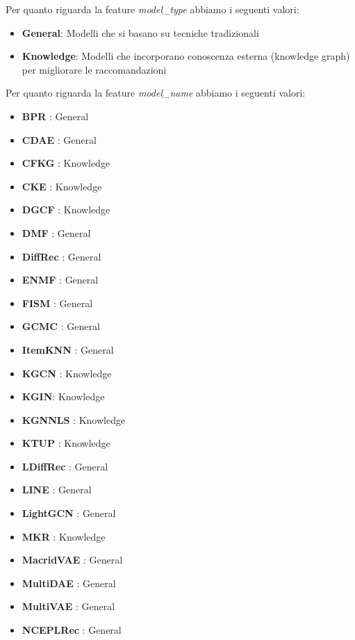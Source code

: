 \noindent Per quanto riguarda la feature \textit{model\_type} abbiamo i seguenti valori:
\begin{itemize}
    \item \textbf{General}: Modelli che si basano su tecniche tradizionali
    \item \textbf{Knowledge}: Modelli che incorporano conoscenza esterna (knowledge graph) per migliorare le raccomandazioni
\end{itemize}

Per quanto riguarda la feature \textit{model\_name} abbiamo i seguenti valori:
\begin{itemize}
    \item \textbf{BPR} \cite{BPR}: General
    \item \textbf{CDAE} \cite{CDAE}: General
    \item \textbf{CFKG} \cite{CFKG}: Knowledge
    \item \textbf{CKE} \cite{CKE}: Knowledge
    \item \textbf{DGCF} \cite{DGCF}: Knowledge
    \item \textbf{DMF} \cite{DMF}: General
    \item \textbf{DiffRec} \cite{DiffRec}: General
    \item \textbf{ENMF} \cite{ENMF}: General 
    \item \textbf{FISM} \cite{FISM}: General
    \item \textbf{GCMC} \cite{GCMC}: General
    \item \textbf{ItemKNN} \cite{ItemKNN}: General
    \item \textbf{KGCN} \cite{KGCN}: Knowledge
    \item \textbf{KGIN}: \cite{KGIN} Knowledge
    \item \textbf{KGNNLS} \cite{KGNNLS}: Knowledge
    \item \textbf{KTUP} \cite{KTUP}: Knowledge
    \item \textbf{LDiffRec} \cite{LDiffRec}: General
    \item \textbf{LINE} \cite{LINE}: General
    \item \textbf{LightGCN} \cite{LightGCN}: General
    \item \textbf{MKR} \cite{MKR}: Knowledge
    \item \textbf{MacridVAE} \cite{MacridVAE}: General
    \item \textbf{MultiDAE} \cite{MultiDAE}: General
    \item \textbf{MultiVAE} \cite{MultiVAE}: General
    \item \textbf{NCEPLRec} \cite{NCEPLRec}: General

\end{itemize}
